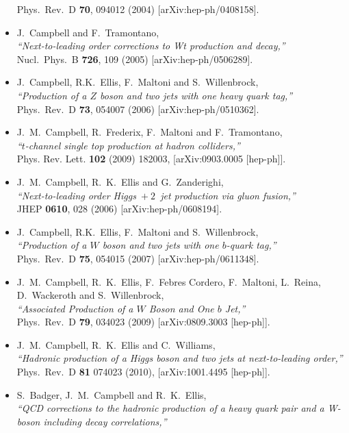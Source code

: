 \documentclass[12pt]{article}
\begin{document}
\begin{itemize}
  Phys.\ Rev.\ D {\bf 70}, 094012 (2004)
  [arXiv:hep-ph/0408158].
\item J.~Campbell and F.~Tramontano, \\
  {\it ``Next-to-leading order corrections to Wt production and
  decay,''} \\
  Nucl.\ Phys.\ B {\bf 726}, 109 (2005)
  [arXiv:hep-ph/0506289].
\item J.~Campbell, R.K.~Ellis, F.~Maltoni and S.~Willenbrock, \\
  {\it ``Production of a $Z$ boson and two jets with one heavy quark tag,''} \\
  Phys.\ Rev.\ D {\bf 73}, 054007 (2006)
  [arXiv:hep-ph/0510362].
\item J.~M.~Campbell, R.~Frederix, F.~Maltoni and F.~Tramontano,\\
  {\it ``$t$-channel single top production at hadron colliders,''} \\ 
  Phys. Rev. Lett. {\bf 102} (2009) 182003,
  [arXiv:0903.0005 [hep-ph]].
\item J.~M.~Campbell, R.~K.~Ellis and G.~Zanderighi, \\
  {\it ``Next-to-leading order Higgs~$+~2$~jet production via gluon fusion,''} \\
  JHEP {\bf 0610}, 028 (2006)
  [arXiv:hep-ph/0608194].
\item J.~Campbell, R.K.~Ellis, F.~Maltoni and S.~Willenbrock, \\
  {\it ``Production of a $W$ boson and two jets with one $b$-quark
  tag,''} \\
  Phys.\ Rev.\ D {\bf 75}, 054015 (2007)
  [arXiv:hep-ph/0611348].
\item J.~M.~Campbell, R.~K.~Ellis, F.~Febres Cordero, F.~Maltoni, L.~Reina, D.~Wackeroth and S.~Willenbrock, \\
  {\it ``Associated Production of a $W$ Boson and One $b$ Jet,''} \\
  Phys.\ Rev.\  D {\bf 79}, 034023 (2009)
  [arXiv:0809.3003 [hep-ph]].
\item J.~M.~Campbell, R.~K.~Ellis and C.~Williams, \\
  {\it ``Hadronic production of a Higgs boson and two jets at next-to-leading order,''} \\
   Phys.\ Rev.\ D {\bf 81} 074023 (2010),
  [arXiv:1001.4495 [hep-ph]].
\item S.~Badger, J.~M.~Campbell and R.~K.~Ellis, \\
  {\it ``QCD corrections to the hadronic production of a heavy quark pair and a  W-boson including decay correlations,''} \\

\end{itemize}
\end{document}
